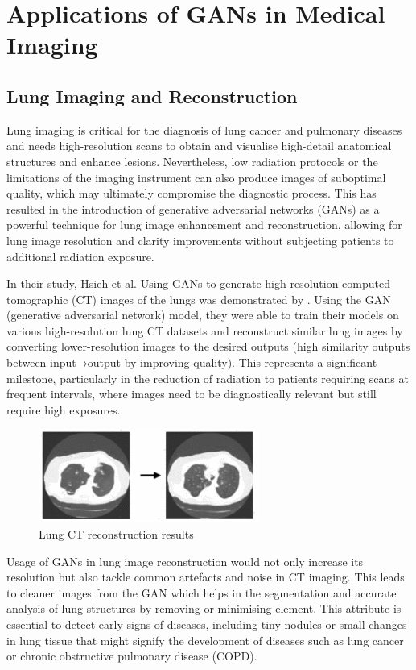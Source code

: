 \documentclass[12pt]{article}
\begin{document}
\section{Applications of GANs in Medical Imaging}
\subsection{Lung Imaging and Reconstruction}

Lung imaging is critical for the diagnosis of lung cancer and pulmonary diseases and needs high-resolution scans to obtain and visualise high-detail anatomical structures and enhance lesions. Nevertheless, low radiation protocols or the limitations of the imaging instrument can also produce images of suboptimal quality, which may ultimately compromise the diagnostic process. This has resulted in the introduction of generative adversarial networks (GANs) as a powerful technique for lung image enhancement and reconstruction, allowing for lung image resolution and clarity improvements without subjecting patients to additional radiation exposure.

In their study, Hsieh et al. Using GANs to generate high-resolution computed tomographic (CT) images of the lungs was demonstrated by \cite{Hsieh2020}. Using the GAN (generative adversarial network) model, they were able to train their models on various high-resolution lung CT datasets and reconstruct similar lung images by converting lower-resolution images to the desired outputs (high similarity outputs between input→output by improving quality). This represents a significant milestone, particularly in the reduction of radiation to patients requiring scans at frequent intervals, where images need to be diagnostically relevant but still require high exposures.

\begin{figure}[h]
\includegraphics[]{resultsLung.png}
\centering
\caption{Lung CT reconstruction results}
\end{figure}

Usage of GANs in lung image reconstruction would not only increase its resolution but also tackle common artefacts and noise in CT imaging. This leads to cleaner images from the GAN which helps in the segmentation and accurate analysis of lung structures by removing or minimising element. This attribute is essential to detect early signs of diseases, including tiny nodules or small changes in lung tissue that might signify the development of diseases such as lung cancer or chronic obstructive pulmonary disease (COPD).
\end{document}
